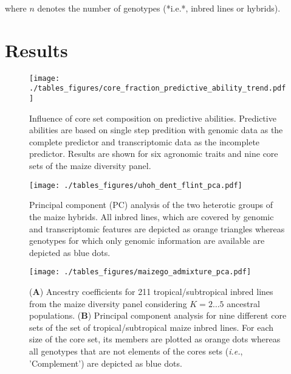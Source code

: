 \documentclass[12pt,titlepage]{article}
\begin{document}
where $n$ denotes the number of genotypes (*i.e.*, inbred lines or hybrids).












\section*{Results}

\begin{figure}[H]
\centering
\texttt{[image: ./tables\_figures/core\_fraction\_predictive\_ability\_trend.pdf]}
\caption{
Influence of core set composition on predictive abilities.
Predictive abilities are based on single step predition with genomic data as the 
complete predictor and transcriptomic data as the incomplete predictor.
Results are shown for six agronomic traits and nine core sets of the maize 
diversity panel.
}
\label{fig:CoreSetInfluence}
\end{figure}


\begin{figure}[H]
\centering
\texttt{[image: ./tables\_figures/uhoh\_dent\_flint\_pca.pdf]}
\caption{
  Principal component (PC) analysis of the two heterotic groups of the maize 
  hybrids.
  All inbred lines, which are covered by genomic and transcriptomic features
  are depicted as orange triangles whereas genotypes for which only genomic
  information are available are depicted as blue dots.
}
\label{fig:UHOH-PCA}
\end{figure}


\begin{figure}[H]
\centering
\texttt{[image: ./tables\_figures/maizego\_admixture\_pca.pdf]}
\caption{
  (\textbf{A}) Ancestry coefficients for 211 tropical/subtropical inbred lines
  from the maize diversity panel considering $K=2 \dots 5$ ancestral
  populations.
  (\textbf{B}) Principal component analysis for nine different core sets of the
  set of tropical/subtropical maize inbred lines.
  For each size of the core set, its members are plotted as orange dots whereas 
  all genotypes that are not elements of the cores sets (\textit{i.e.},
  'Complement') are depicted as blue dots.
}
\label{fig:PopStructure}
\end{figure}
\end{document}
